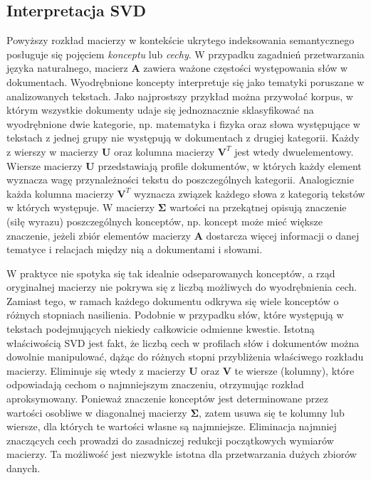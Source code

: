 \documentclass{pracamgr}
\begin{document}
\subsection{Interpretacja SVD}
Powyższy rozkład macierzy w kontekście ukrytego indeksowania semantycznego posługuje się pojęciem \textit{konceptu} lub \textit{cechy}. W przypadku zagadnień przetwarzania języka naturalnego, macierz $\mathbf{A}$ zawiera ważone częstości występowania słów w dokumentach. Wyodrębnione koncepty interpretuje się jako tematyki poruszane w analizowanych tekstach. Jako najprostszy przykład można przywołać korpus, w którym wszystkie dokumenty udaje się jednoznacznie sklasyfikować na wyodrębnione dwie kategorie, np. matematyka i fizyka oraz słowa występujące w tekstach z jednej grupy nie występują w dokumentach z drugiej kategorii. Każdy z wierszy w macierzy $\mathbf{U}$ oraz kolumna macierzy $\mathbf{V}^T$ jest wtedy dwuelementowy. Wiersze macierzy $\mathbf{U}$ przedstawiają profile dokumentów, w których każdy element wyznacza wagę przynależności tekstu do poszczególnych kategorii. Analogicznie każda kolumna macierzy $\mathbf{V}^T$ wyznacza związek każdego słowa z kategorią tekstów w których występuje. W macierzy $\mathbf{\Sigma}$ wartości na przekątnej opisują znaczenie (siłę wyrazu) poszczególnych konceptów, np. koncept może mieć większe znaczenie, jeżeli zbiór elementów macierzy $\mathbf{A}$ dostarcza więcej informacji o danej tematyce i relacjach między nią a dokumentami i słowami.

W praktyce nie spotyka się tak idealnie odseparowanych konceptów, a rząd oryginalnej macierzy nie pokrywa się z liczbą możliwych do wyodrębnienia cech. Zamiast tego, w ramach każdego dokumentu odkrywa się wiele konceptów o różnych stopniach nasilienia. Podobnie w przypadku słów, które występują w tekstach podejmujących niekiedy całkowicie odmienne kwestie. Istotną właściwością SVD jest fakt, że liczbą cech w profilach słów i dokumentów można dowolnie manipulować, dążąc do różnych stopni przybliżenia właściwego rozkładu macierzy. Eliminuje się wtedy z macierzy $\mathbf{U}$ oraz $\mathbf{V}$ te wiersze (kolumny), które odpowiadają cechom o najmniejszym znaczeniu, otrzymując rozkład aproksymowany. Ponieważ znaczenie konceptów jest determinowane przez wartości osobliwe w diagonalnej macierzy $\mathbf{\Sigma}$, zatem usuwa się te kolumny lub wiersze, dla których te wartości własne są najmniejsze. Eliminacja najmniej znaczących cech prowadzi do zasadniczej redukcji początkowych wymiarów macierzy. Ta możliwość jest niezwykle istotna dla przetwarzania dużych zbiorów danych.
\end{document}
